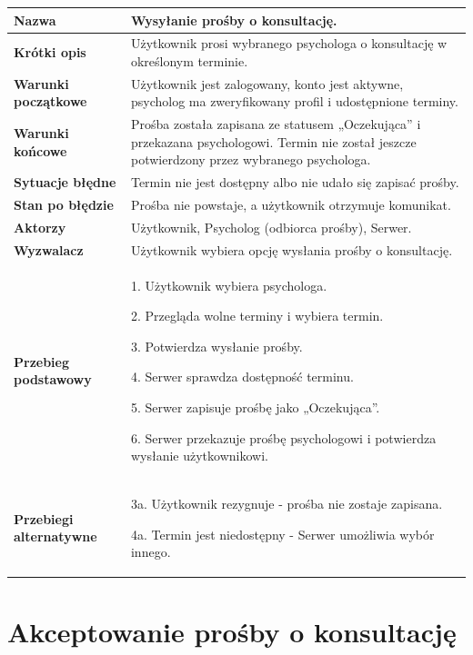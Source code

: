 \documentclass[11pt,a4paper]{article}
\renewcommand{\arraystretch}{1.3}
\newcommand{\pole}[2]{
\textbf{#1} & #2 \\ \hline
}
\begin{document}
\begin{tabularx}{\textwidth}{|p{3.9cm}|Y|}
\hline

\pole{Nazwa}{
Wysyłanie prośby o konsultację.
}

\pole{Krótki opis}{
Użytkownik prosi wybranego psychologa
o konsultację w określonym terminie.
}

\pole{Warunki początkowe}{
Użytkownik jest zalogowany, konto jest aktywne,
psycholog ma zweryfikowany profil
i udostępnione terminy.
}

\pole{Warunki końcowe}{
Prośba została zapisana ze statusem
„Oczekująca” i przekazana psychologowi.
Termin nie został jeszcze potwierdzony przez wybranego psychologa.
}

\pole{Sytuacje błędne}{
Termin nie jest dostępny albo nie udało się
zapisać prośby.
}

\pole{Stan po błędzie}{
Prośba nie powstaje, a użytkownik
otrzymuje komunikat.
}

\pole{Aktorzy}{
Użytkownik,
Psycholog (odbiorca prośby),
Serwer.
}

\pole{Wyzwalacz}{
Użytkownik wybiera opcję wysłania
prośby o konsultację.
}

\pole{Przebieg podstawowy}{
1. Użytkownik wybiera psychologa.\par
2. Przegląda wolne terminy i wybiera termin.\par
3. Potwierdza wysłanie prośby.\par
4. Serwer sprawdza dostępność terminu.\par
5. Serwer zapisuje prośbę jako „Oczekująca”.\par
6. Serwer przekazuje prośbę psychologowi
i potwierdza wysłanie użytkownikowi.
}

\pole{Przebiegi alternatywne}{
3a. Użytkownik rezygnuje -
prośba nie zostaje zapisana.\par
4a. Termin jest niedostępny -
Serwer umożliwia wybór innego.
}

\end{tabularx}
\endgroup

\clearpage

\section*{Akceptowanie prośby o konsultację}

\begingroup
\small
\renewcommand{\arraystretch}{1.14}
\end{document}
